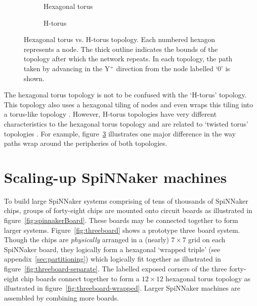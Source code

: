 		\begin{figure}
			\center
			\begin{subfigure}[b]{0.45\linewidth}
				\center
				\caption{Hexagonal torus}
				\label{fig:topo-compare-hexagonal-torus}
			\end{subfigure}
			\begin{subfigure}[b]{0.45\linewidth}
				\center
				\caption{H-torus}
				\label{fig:topo-compare-h-torus}
			\end{subfigure}
			
			\caption[Hexagonal torus vs. H-torus topology.]%
			{Hexagonal torus vs. H-torus topology. Each numbered hexagon
			represents a node. The thick outline indicates the bounds of the
			topology after which the network repeats. In each topology, the path
			taken by advancing in the Y$^+$ direction from the node labelled `0' is
			shown.}
			\label{fig:topo-compare}
		\end{figure}
		
		\label{sec:hex-vs-h-torus}
		
		The hexagonal torus topology is not to be confused with the `H-torus'
		topology. This topology also uses a hexagonal tiling of nodes and even
		wraps this tiling into a torus-like topology \cite{zhao08}. However,
		H-torus topologies have very different characteristics to the hexagonal
		torus topology and are related to `twisted torus' topologies
		\cite{camara10}. For example, figure~\ref{fig:topo-compare} illustrates one
		major difference in the way paths wrap around the peripheries of both
		topologies.
	
	\section{Scaling-up SpiNNaker machines}
		
		To build large SpiNNaker systems comprising of tens of thousands of
		SpiNNaker chips, groups of forty-eight chips are mounted onto circuit
		boards as illustrated in figure~\ref{fig:spinnakerBoard}. These boards may
		be connected together to form larger systems.  Figure~\ref{fig:threeboard}
		shows a prototype three board system. Though the chips are
		\emph{physically} arranged in a (nearly) $7\times7$ grid on each SpiNNaker
		board, they logically form a hexagonal `wrapped triple'
		\cite{davidsonWiring} (see appendix~\ref{sec:partitioning}) which logically
		fit together as illustrated in figure~\ref{fig:threeboard-separate}. The
		labelled exposed corners of the three forty-eight chip boards connect
		together to form a $12\times12$ hexagonal torus topology as illustrated in
		figure~\ref{fig:threeboard-wrapped}. Larger SpiNNaker machines are
		assembled by combining more boards.
		
